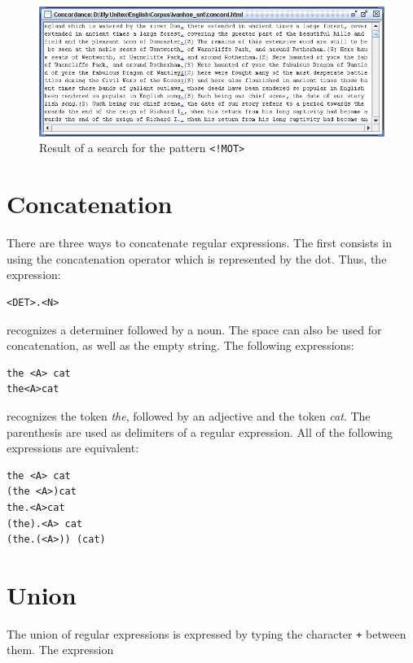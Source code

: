 \bigskip
\begin{figure}[h]
\begin{center}
\includegraphics[width=15cm]{resources/img/fig4-2.png}
\caption{Result of a search for the pattern
\texttt{<!MOT>}\label{fig-search-<!MOT>}}
\end{center}
\end{figure}

\section{Concatenation}
There are three ways to concatenate regular expressions. The first consists in
using the concatenation operator which is represented by the dot.
Thus, the expression:

\begin{verbatim}
<DET>.<N>
\end{verbatim}

\noindent recognizes a determiner followed by a noun. The space can also be used for
concatenation, as well as the empty string. The following expressions:

\begin{verbatim}
the <A> cat
the<A>cat
\end{verbatim}

\noindent recognizes the token \textit{the}, followed by an adjective and the
token \textit{cat}. The parenthesis
 are used as delimiters of a regular expression.  All of the
following expressions are equivalent:

\begin{verbatim}
the <A> cat
(the <A>)cat
the.<A>cat
(the).<A> cat
(the.(<A>)) (cat)
\end{verbatim}

\section{Union}
\index{\verb$+$}
The union of regular expressions is expressed by typing the character \verb$+$
between them. The expression

